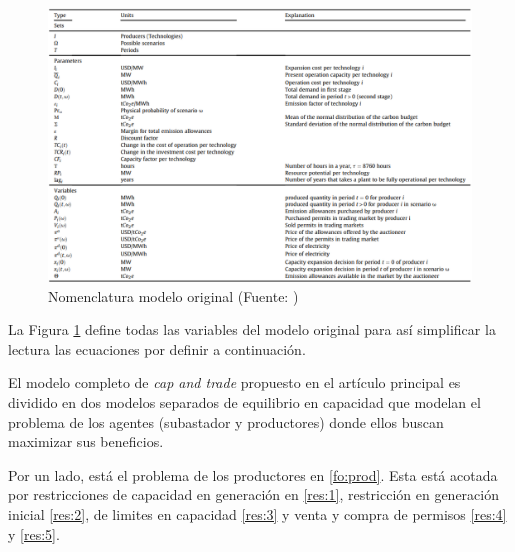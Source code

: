 \begin{figure}[htp]
    \centering
    \includegraphics[width=15cm]{docs/DocumentoMemoria/images/Tabla amigo.png}
    \caption{Nomenclatura modelo original (Fuente: \protect{})}
    \label{fig:nomenclatura1}
\end{figure}

La Figura \ref{fig:nomenclatura1} define todas las variables del modelo original para así simplificar la lectura las ecuaciones por definir a continuación.
\vspace{2.5mm}

El modelo completo de \textit{cap and trade} propuesto en el artículo principal es dividido en dos modelos separados de equilibrio en capacidad que modelan el problema de los agentes (subastador y productores) donde ellos buscan maximizar sus beneficios.
\vspace{2.5mm}

Por un lado, está el problema de los productores en \ref{fo:prod}. Esta está acotada por restricciones de capacidad en generación en \ref{res:1}, restricción en generación inicial \ref{res:2}, de limites en capacidad \ref{res:3} y venta y compra de permisos \ref{res:4} y \ref{res:5}. 

